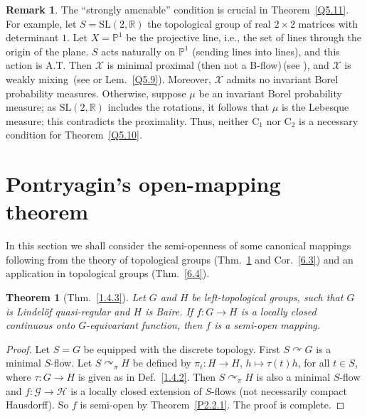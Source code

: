 \documentclass[12pt,final,3p,times]{elsarticle}
\newtheorem{thm}{Theorem}[section]
\theoremstyle{definition}
\newtheorem{srem}[sthm]{Remark}
\numberwithin{equation}{section}
\begin{document}
\begin{srem}\label{Q5.12}
The ``strongly amenable'' condition is crucial in Theorem~\ref{Q5.11}. For example, let $S=\mathrm{SL}(2,\mathbb{R})$ the topological group of real $2\times 2$ matrices with determinant $1$. Let $X=\mathbb{P}^1$ be the projective line, i.e., the set of lines through the origin of the plane. $S$ acts naturally on $\mathbb{P}^1$ (sending lines into lines), and this action is A.T. Then $\mathscr{X}$ is minimal proximal (then not a B-flow)\,(see \cite[II.5.6]{G76}), and $\mathscr{X}$ is weakly mixing~(see \cite[Cor.~II.2.2]{G76} or Lem.~\ref{Q5.9}).
Moreover, $\mathscr{X}$ admits no invariant Borel probability measures. Otherwise, suppose $\mu$ be an invariant Borel probability measure; as $\mathrm{SL}(2,\mathbb{R})$ includes the rotations, it follows that $\mu$ is the Lebesque measure; this contradicts the proximality. Thus, neither $\mathrm{C}_1$ nor $\mathrm{C}_2$ is a necessary condition for Theorem~\ref{Q5.10}.
\end{srem}

\section{Pontryagin's open-mapping theorem}\label{s6}
In this section we shall consider the semi-openness of some canonical mappings following from the theory of topological groups (Thm.~\ref{6.1} and Cor.~\ref{6.3}) and an application in topological groups (Thm.~\ref{6.4}).

\begin{thm}[Thm.~\ref{1.4.3}]\label{6.1}
Let $G$ and $H$ be left-topological groups, such that $G$ is Lindel\"{o}f  quasi-regular and $H$ is Baire. If $f\colon G\rightarrow H$ is a locally closed continuous onto $G$-equivariant function, then $f$ is a semi-open mapping.
\end{thm}

\begin{proof}
Let $S=G$ be equipped with the discrete topology. First $S\curvearrowright G$ is a minimal $S$-flow. Let $S\curvearrowright_\pi H$ be defined by $\pi_t\colon H\rightarrow H$, $h\mapsto \tau(t)h$, for all $t\in S$, where $\tau\colon G\rightarrow H$ is given as in Def.~\ref{1.4.2}. Then $S\curvearrowright_\pi H$ is also a minimal $S$-flow and $f\colon\mathscr{G}\rightarrow\mathscr{H}$ is a locally closed extension of $S$-flows (not necessarily compact Hausdorff). So $f$ is semi-open by Theorem~\ref{P2.2.1}.
The proof is complete.
\end{proof}
\end{document}
